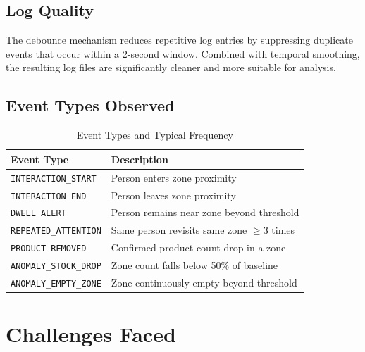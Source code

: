 \documentclass[12pt,a4paper]{article}
\begin{document}
\subsection{Log Quality}

The debounce mechanism reduces repetitive log entries by suppressing duplicate events that occur within a 2-second window.
Combined with temporal smoothing, the resulting log files are significantly cleaner and more suitable for analysis.

\subsection{Event Types Observed}

\begin{table}[h]
\centering
\caption{Event Types and Typical Frequency}
\begin{tabularx}{\textwidth}{lX}
\toprule
\textbf{Event Type} & \textbf{Description} \\
\midrule
\texttt{INTERACTION\_START} & Person enters zone proximity \\
\texttt{INTERACTION\_END} & Person leaves zone proximity \\
\texttt{DWELL\_ALERT} & Person remains near zone beyond threshold \\
\texttt{REPEATED\_ATTENTION} & Same person revisits same zone $\geq3$ times \\
\texttt{PRODUCT\_REMOVED} & Confirmed product count drop in a zone \\
\texttt{ANOMALY\_STOCK\_DROP} & Zone count falls below 50\% of baseline \\
\texttt{ANOMALY\_EMPTY\_ZONE} & Zone continuously empty beyond threshold \\
\bottomrule
\end{tabularx}
\end{table}

\section{Challenges Faced}
\end{document}
